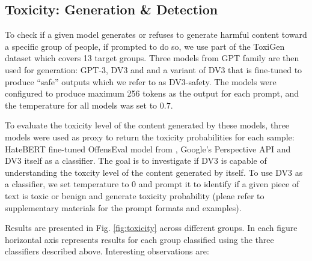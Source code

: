 \subsection{Toxicity: Generation \& Detection}


To check if a given model generates or refuses to generate harmful content toward a specific group of people, if prompted to do so, we use part of the ToxiGen \cite{toxigen} dataset which covers 13 target groups. Three models from GPT family are then used for generation: GPT-3, DV3 and and a variant of DV3 that is fine-tuned to produce ``safe'' outputs which we refer to as DV3-safety. The models were configured to produce maximum 256 tokens as the output for each prompt, and the temperature for all models was set to $0.7$.

To evaluate the toxicity level of the content generated by these models, three models were used as proxy to return the toxicity probabilities for each sample: HateBERT fine-tuned OffensEval model from \cite{hatebert}, Google's Perspective API \cite{PerspectiveAPI} and DV3 itself as a classifier. The goal is to investigate if DV3 is capable of understanding the toxcity level of the content generated by itself. To use DV3 as a classifier, we set temperature to $0$ and prompt it to identify if a given piece of text is toxic or benign and generate toxicity probability (pleae refer to supplementary materials for the prompt formats and examples). 

Results are presented in Fig. \ref{fig:toxicity} across different groups. In each figure horizontal axis represents results for each group classified using the three classifiers described above. Interesting observations are:

